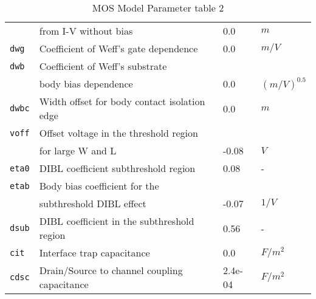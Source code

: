 \documentclass{article}
\begin{document}
\begin{table}[H]
\begin{tabular}{|l| l| l| l|}
             & from I-V without bias & 0.0 & $m$\\
\texttt{dwg} & Coefficient of Weff's gate dependence & 0.0 & $m/V$\\
\texttt{dwb} & Coefficient of Weff's substrate & &\\
             & body bias dependence & 0.0 & $(m/V)^0.5$\\
\texttt{dwbc} & Width offset for body contact isolation edge & 0.0 & $m$\\
\texttt{voff} & Offset voltage in the threshold region & & \\
              & for large W and L & -0.08 & $V$ \\
\texttt{eta0} & DIBL coefficient subthreshold region & 0.08 & -\\
\texttt{etab} & Body bias coefficient for the & & \\
              & subthreshold DIBL effect & -0.07 & $1/V$\\
\texttt{dsub} & DIBL coefficient in the subthreshold region & 0.56 & -\\
\texttt{cit} & Interface trap capacitance & 0.0 & $F/m^2$\\
\texttt{cdsc} & Drain/Source to channel coupling capacitance & 2.4e-04 & $F/m^2$\\
\hline
\end{tabular}
\caption{\label{bsim3soi.params2} MOS Model Parameter table 2}
\end{table}
\end{document}

